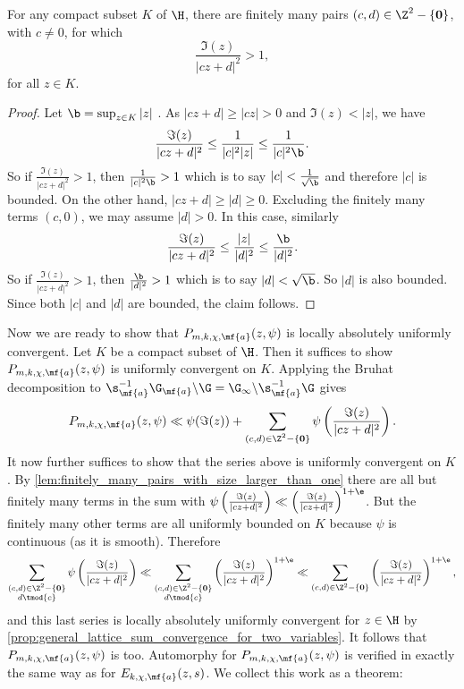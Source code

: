     \begin{lemma}\label{lem:finitely_many_pairs_with_size_larger_than_one}
      For any compact subset $K$ of $\H$, there are finitely many pairs $(c,d) \in \Z^{2}-\{\mathbf{0}\}$, with $c \neq 0$, for which
      \[
        \frac{\Im(z)}{|cz+d|^{2}} > 1,
      \]
      for all $z \in K$.
      \end{lemma}
      \begin{proof}
      Let $\b = \sup_{z \in K}|z|$ . As $|cz+d| \ge |cz| > 0$ and $\Im(z) < |z|$, we have
      \[
        \frac{\Im(z)}{|cz+d|^{2}} \le \frac{1}{|c|^{2}|z|} \le \frac{1}{|c|^{2}\b}.
      \]
      So if $\frac{\Im(z)}{|cz+d|^{2}} > 1$, then $\frac{1}{|c|^{2}\b} > 1$ which is to say $|c| < \frac{1}{\sqrt{\b}}$ and therefore $|c|$ is bounded. On the other hand, $|cz+d| \ge |d| \ge 0$. Excluding the finitely many terms $(c,0)$, we may assume $|d| > 0$. In this case, similarly  
      \[
        \frac{\Im(z)}{|cz+d|^{2}} \le \frac{|z|}{|d|^{2}} \le \frac{\b}{|d|^{2}}.
      \]
      So if $\frac{\Im(z)}{|cz+d|^{2}} > 1$, then $\frac{\b}{|d|^{2}}> 1$ which is to say $|d| < \sqrt{\b}$. So $|d|$ is also bounded. Since both $|c|$ and $|d|$ are bounded, the claim follows.
    \end{proof}
    
    Now we are ready to show that $P_{m,k,\chi,\mf{a}}(z,\psi)$ is locally absolutely uniformly convergent. Let $K$ be a compact subset of $\H$. Then it suffices to show $P_{m,k,\chi,\mf{a}}(z,\psi)$ is uniformly convergent on $K$. Applying the Bruhat decomposition to $\s_{\mf{a}}^{-1}\G_{\mf{a}}\backslash\G = \G_{\infty}\backslash\s_{\mf{a}}^{-1}\G$ gives
    \[
      P_{m,k,\chi,\mf{a}}(z,\psi) \ll \psi(\Im(z))+\sum_{\substack{(c,d) \in \Z^{2}-\{\mathbf{0}\}}}\psi\left(\frac{\Im(z)}{|cz+d|^{2}}\right).
    \]
    It now further suffices to show that the series above is uniformly convergent on $K$. By \cref{lem:finitely_many_pairs_with_size_larger_than_one} there are all but finitely many terms in the sum with $\psi\left(\frac{\Im(z)}{|cz+d|^{2}}\right) \ll \left(\frac{\Im(z)}{|cz+d|^{2}}\right)^{1+\e}$. But the finitely many other terms are all uniformly bounded on $K$ because $\psi$ is continuous (as it is smooth). Therefore
    \[
      \sum_{\substack{(c,d) \in \Z^{2}-\{\mathbf{0}\} \\ d \tmod{c}}}\psi\left(\frac{\Im(z)}{|cz+d|^{2}}\right) \ll \sum_{\substack{(c,d) \in \Z^{2}-\{\mathbf{0}\} \\ d \tmod{c}}}\left(\frac{\Im(z)}{|cz+d|^{2}}\right)^{1+\e} \ll \sum_{(c,d) \in \Z^{2}-\{\mathbf{0}\}}\left(\frac{\Im(z)}{|cz+d|^{2}}\right)^{1+\e},
    \]
    and this last series is locally absolutely uniformly convergent for $z \in \H$ by \cref{prop:general_lattice_sum_convergence_for_two_variables}. It follows that $P_{m,k,\chi,\mf{a}}(z,\psi)$ is too. Automorphy for $P_{m,k,\chi,\mf{a}}(z,\psi)$ is verified in exactly the same way as for $E_{k,\chi,\mf{a}}(z,s)$. We collect this work as a theorem:

